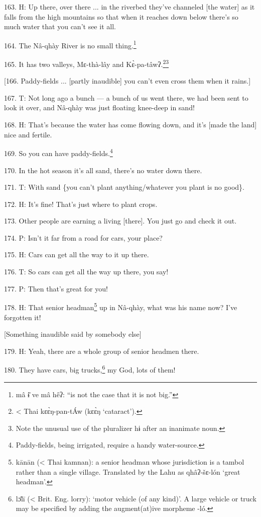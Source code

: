 163. H: Up there, over there ... in the riverbed they've channeled [the water]
as it falls from the high mountains so that when it reaches down below there's
so much water that you can't see it all.

164. The Nâ-qhày River is no small thing.\footnote{mâ ɨ̄ ve mâ hêʔ: ``is not the case that it is not big.''}

165. It has two valleys, Mɛ-thà-lây and Kɛ̀-pa-tâwʔ.\footnote{< Thai kɛɛ̀ŋ-pan-tÁw (kɛɛ̀ŋ `cataract').}\footnote{Note the unusual use of the pluralizer hɨ after an inanimate noun.}

[166. Paddy-fields ... [partly inaudible] you can't even cross them when it rains.]

167. T: Not long ago a bunch --- a bunch of us went there, we had been sent to
look it over, and Nâ-qhày was just floating knee-deep in sand!

168. H: That's because the water has come flowing down, and it's [made the land]
nice and fertile.

169. So you can have paddy-fields.\footnote{Paddy-fields, being irrigated, require a handy water-source.}

170. In the hot season it's all sand, there's no water down there.

171. T: With sand \{you can't plant anything/whatever you plant is no good\}.

172. H: It's fine! That's just where to plant crops.

173. Other people are earning a living [there]. You just go and check it out.

174. P: Isn't it far from a road for cars, your place?

175. H: Cars can get all the way to it up there.

176. T: So cars can get all the way up there, you say!

177. P: Then that's great for you!

178. H: That senior headman\footnote{kānān (< Thai kamnan): a senior headman whose jurisdiction is a tambol rather than a single village. Translated by the Lahu as qhâʔ-šɛ-lón `great headman'.} up in Nâ-qhày, what was his name now? I've forgotten
it!

[Something inaudible said by somebody else]

179. H: Yeah, there are a whole group of senior headmen there.

180. They have cars, big trucks,\footnote{lɔ̄lī (< Brit. Eng. lorry): `motor vehicle (of any kind)'. A large vehicle or truck may be specified by adding the augment(at)ive morpheme -ló.} my God, lots of them!

